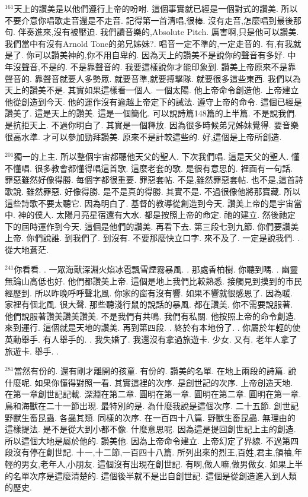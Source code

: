 \documentclass{book}
\begin{document}
$^{161}$天上的讚美是以他們遵行上帝的吩咐.
這個事實就已經是一個對式的讚美.
所以不要介意你唱歌走音還是不走音.
記得第一首清唱,很棒.
沒有走音,怎麼唱到最後那句.
伴奏進來,沒有被壓迫.
我們讀音樂的,Absolute Pitch.
厲害啊,只是他可以讚美.
我們當中有沒有Arnold Tone的弟兄姊妹?.
唱音一定不準的,一定走音的.
有,有我就是了.
你可以讚美神的,你不用自卑的.
因為天上的讚美不是說你的聲音有多好.
中年沒聲音,不是的.
不是靠聲音的.
我要這樣說你才能印象到.
讚美上帝原來不是靠聲音的.
靠聲音就要人多勢眾.
就要音準,就要搏擊隊.
就要很多這些東西.
我們以為天上的讚美不是.
其實如果這樣看一個人.
一個太陽.
他上帝命令創造他.
上帝建立他從創造到今天.
他的運作沒有逾越上帝定下的誡法.
遵守上帝的命令.
這個已經是讚美了.
這是天上的讚美.
這是一個簡化.
可以說詩篇148篇的上半篇.
不是說我們.
是抗拒天上.
不過你明白了.
其實是一個釋放.
因為很多時候弟兄姊妹覺得.
要音樂很高水準.
才可以參加勁拜讚美.
原來不是計較這些的.
好,這個是上帝所創造.

$^{201}$獨一的上主.
所以整個宇宙都聽他天父的聖人.
下次我們唱.
這是天父的聖人.
懂不懂唱.
很多教會都懂得唱這首歌.
這麼老套的歌.
是很有意思的.
裡面有一句話.
罪惡雖然好像得勝.
每個字都很重要.
罪惡套帖.
不是,雖然罪惡套帖.
也不是,這首詩歌說.
雖然罪惡.
好像得勝.
是不是真的得勝.
其實不是.
不過很像他將那寶藏.
所以這些詩歌不要太聽它.
因為明白了.
基督的教導從創造到今天.
讚美上帝的是宇宙當中.
神的僕人.
太陽月亮星宿還有大水.
都是按照上帝的命定.
祂的建立.
然後祂定下的屆時運作到今天.
這個是他們的讚美.
再看下去.
第三段七到九節.
你們要讚美上帝.
你們說誰.
到我們了.
到沒有.
不要那麼快立口字.
來不及了.
一定是說我們.
.
從大地蒼茫.

$^{241}$你看看.
.
一眾海獸深淵火焰冰雹飄雪煙霧暴風.
.
那處香柏樹.
你聽到嗎.
.
幽靈無論山高低也好.
他們都讚美上帝.
這個是地上我們比較熟悉.
接觸見到摸到的市民經歷到.
所以昨晚呼呼聲北風.
你家的窗有沒有響.
如果不響就很感恩了.
因為暖.
家裡有個北風.
很大聲.
那些聽淺行鼠的說話的暴風.
都在讚美.
你不需要說服著.
他們說服著讚美讚美讚美.
不是我們有共鳴.
我們有私關.
他按照上帝的命令創造.
來到運行.
這個就是天地的讚美.
再到第四段.
.
終於有本地份了.
.
你屬於年輕的使英勳舉手.
有人舉手的.
.
我失婚了.
我還沒有拿過旅遊卡.
少女.
又有.
老年人拿了旅遊卡.
舉手.
.

$^{281}$當然有份的.
還有剛才離開的孩童.
有份的.
讚美的名單.
在地上兩段的詩篇.
說什麼呢.
如果你懂得對照一看.
其實這裡的次序.
是創世記的次序.
上帝創造天地.
在第一章創世記記載.
深淵在第二章.
圓明在第一章.
圓明在第二章.
圓明在第一章.
鳥和海獸在二十一節出現.
最特別的是.
為什麼我說是這個次序.
二十五節.
創世記野獸生畜昆蟲.
各蟲其類.
同樣的次序.
在一百四十八篇.
野獸生畜昆蟲.
無理由的這樣提法.
是不是從大到小都不像.
什麼意思呢.
因為這是提回創世記上主的創造.
所以這個大地是屬於他的.
讚美他.
因為上帝命令建立.
上帝幻定了界線.
不過第四段沒有停在創世記.
十一,十二節,一百四十八篇.
所列出來的烈王,百姓,君主,領袖,年輕的男女,老年人,小朋友.
這個沒有出現在創世記.
有啊,做人嘛,做男做女.
如果上半的名單次序是這麼清楚的.
這個後半就不是出自創世記.
這個是從創造進入到人類的歷史.
\end{document}

